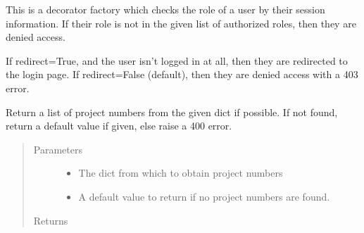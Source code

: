 \documentclass[letterpaper,10pt,english]{sphinxmanual}
\begin{document}
\begin{fulllineitems}
\label{\detokenize{apidoc/utdesign_procurement:utdesign_procurement.utils.authorizedRoles}}
This is a decorator factory which checks the role of a user by their
session information. If their role is not in the given list of
authorized roles, then they are denied access.

If redirect=True, and the user isn’t logged in at all, then they are
redirected to the login page. If redirect=False (default), then they
are denied access with a 403 error.

\end{fulllineitems}


\begin{fulllineitems}
\label{\detokenize{apidoc/utdesign_procurement:utdesign_procurement.utils.checkProjectNumbers}}
Return a list of project numbers from the given dict if possible.
If not found, return a default value if given, else raise a 400 error.
\begin{quote}\begin{description}
\item[{Parameters}] \leavevmode\begin{itemize}
\item {} 
 \textendash{} The dict from which to obtain project numbers

\item {} 
 \textendash{} A default value to return if no project numbers are
found.

\end{itemize}

\item[{Returns}] \leavevmode


\end{description}\end{quote}

\end{fulllineitems}
\end{document}
